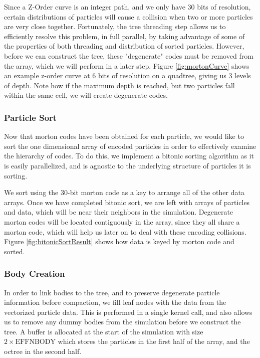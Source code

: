 \documentclass{thesis}
\begin{document}
Since a Z-Order curve is an integer path, and we only have 30 bits of resolution, certain distributions of particles will cause a collision when two or more particles are very close together. Fortunately, the tree threading step allows us to efficiently resolve this problem, in full parallel, by taking advantage of some of the properties of both threading and distribution of sorted particles. However, before we can construct the tree, these "degenerate" codes must be removed from the array, which we will perform in a later step. Figure \ref{fig:mortonCurve} shows an example z-order curve at 6 bits of resolution on a quadtree, giving us 3 levels of depth. Note how if the maximum depth is reached, but two particles fall within the same cell, we will create degenerate codes.


\subsubsection{Particle Sort}
Now that morton codes have been obtained for each particle, we would like to sort the one dimensional array of encoded particles in order to effectively examine the hierarchy of codes. To do this, we implement a bitonic sorting algorithm as it is easily parallelized, and is agnostic to the underlying structure of particles it is sorting.

We sort using the 30-bit morton code as a key to arrange all of the other data arrays. Once we have completed bitonic sort, we are left with arrays of particles and data, which will be near their neighbors in the simulation. Degenerate morton codes will be located contiguously in the array, since they all share a morton code, which will help us later on to deal with these encoding collisions. Figure \ref{fig:bitonicSortResult} shows how data is keyed by morton code and sorted.

\subsubsection{Body Creation}
In order to link bodies to the tree, and to preserve degenerate particle information before compaction, we fill leaf nodes with the data from the vectorized particle data. This is performed in a single kernel call, and also allows us to remove any dummy bodies from the simulation before we construct the tree. A buffer is allocated at the start of the simulation with size $2 \times \text{EFFNBODY}$ which stores the particles in the first half of the array, and the octree in the second half.
\end{document}
